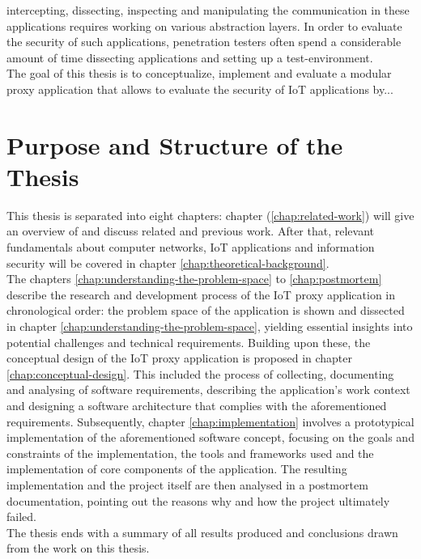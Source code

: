 intercepting, dissecting, inspecting and manipulating the communication in these applications requires working on various abstraction layers. In order to evaluate the security of such applications, penetration testers often spend a considerable amount of time dissecting applications and setting up a test-environment.\\
The goal of this thesis is to conceptualize, implement and evaluate a modular proxy application that allows to evaluate the security of \ac{IoT} applications by... %

\section{Purpose and Structure of the Thesis}
This thesis is separated into eight chapters: chapter (\ref{chap:related-work}) will give an overview of and discuss related and previous work. After that, relevant fundamentals about computer networks, \ac{IoT} applications and information security will be covered in chapter \ref{chap:theoretical-background}.\\
The chapters \ref{chap:understanding-the-problem-space} to \ref{chap:postmortem} describe the research and development process of the \ac{IoT} proxy application in chronological order: the problem space of the application is shown and dissected in chapter \ref{chap:understanding-the-problem-space}, yielding essential insights into potential challenges and technical requirements. Building upon these, the conceptual design of the \ac{IoT} proxy application is proposed in chapter \ref{chap:conceptual-design}. This included the process of collecting, documenting and analysing of software requirements, describing the application's work context and designing a software architecture that complies with the aforementioned requirements. Subsequently, chapter \ref{chap:implementation} involves a prototypical implementation of the aforementioned software concept, focusing on the goals and constraints of the implementation, the tools and frameworks used and the implementation of core components of the application. The resulting implementation and the project itself are then analysed in a postmortem documentation, pointing out the reasons why and how the project ultimately failed.\\
The thesis ends with a summary of all results produced and conclusions drawn from the work on this thesis.